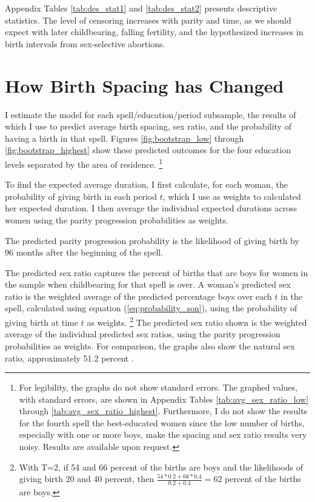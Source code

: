 \documentclass[12pt,letterpaper]{article}
\begin{document}

Appendix Tables \ref{tab:des_stat1} and \ref{tab:des_stat2} presents descriptive 
statistics.
The level of censoring increases with parity and time, as we should expect with later 
childbearing, falling fertility, and the hypothesized increases in birth intervals from 
sex-selective abortions.



\section{How Birth Spacing has Changed\label{sec:results}}


I estimate the model for each spell/education/period subsample, the results of which I use 
to predict average birth spacing, sex ratio, and the probability of having a birth in that 
spell.
Figures \ref{fig:bootstrap_low} through \ref{fig:bootstrap_highest}
show these predicted outcomes for the four education levels separated by the area of 
residence.%
\footnote{
For legibility, the graphs do not show standard errors.
The graphed values, with standard errors, are shown in Appendix Tables 
\ref{tab:avg_sex_ratio_low} through \ref{tab:avg_sex_ratio_highest}.
Furthermore, I do not show the results for the fourth spell the best-educated women since 
the low number of births, especially with one or more boys, make the spacing and sex ratio 
results very noisy.
Results are available upon request.
}

To find the expected average duration, I first calculate, for each woman, the probability 
of giving birth in each period $t$, which I use as weights to calculated her expected 
duration. 
I then average the individual expected durations across women using the parity progression
probabilities as weights.

The predicted parity progression probability is the likelihood of giving birth by 96 
months after the beginning of the spell.

The predicted sex ratio captures the percent of births that are boys for women in 
the sample when childbearing for that spell is over.
A woman's predicted sex ratio is the weighted average of the predicted percentage boys 
over each $t$ in the spell, calculated using equation (\ref{eq:probability_son}), using
the probability of giving birth at time $t$ as weights.%
\footnote{
With T=2, if 54 and 66 percent of the births are boys and the likelihoods of 
giving birth 20 and 40 percent, then $\frac{54*0.2+66*0.4}{0.2+0.4} = 62$ percent of the
births are boys.
}
The predicted sex ratio shown is the weighted average of the individual predicted sex 
ratios, using the parity progression probabilities as weights.
For comparison, the graphs also show the natural sex ratio, approximately 51.2 percent 
\citep{ben-porath76b,jacobsen99,Portner2015b}.
\end{document}
